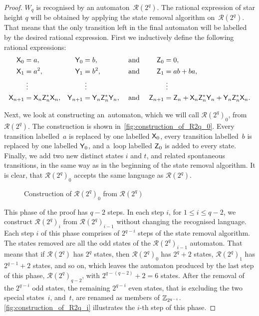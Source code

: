 \begin{proof}
    $W_q$ is recognised by an automaton~${\mathcal{R}(2^q)}$. The rational expression of star height $q$ will be obtained by applying the state removal algorithm on~${\mathcal{R}(2^q)}$. That means that the only transition left in the final automaton will be labelled by the desired rational expression. First we inductively define the following rational expressions:
    \begin{align*}
        {\mathsf{X}}_0 &= a, & {\mathsf{Y}}_0 &= b, & &\text{ and } & {\mathsf{Z}}_0 &= 0, \\
        {\mathsf{X}}_1 &= a^2, & {\mathsf{Y}}_1 &= b^2, & &\text{ and } & {\mathsf{Z}}_1 &= ab+ba, \\
        &\; \vdots & &\; \vdots & & & &\; \vdots \\
        {\mathsf{X}}_{n+1} &= {\mathsf{X}}_n {\mathsf{Z}}_n^* {\mathsf{X}}_n, & {\mathsf{Y}}_{n+1} &= {\mathsf{Y}}_n {\mathsf{Z}}_n^* {\mathsf{Y}}_n, & &\text{ and } & {\mathsf{Z}}_{n+1} &= {\mathsf{Z}}_n + {\mathsf{X}}_n {\mathsf{Z}}_n^* {\mathsf{Y}}_n + {\mathsf{Y}}_n {\mathsf{Z}}_n^* {\mathsf{X}}_n.
    \end{align*}

    Next, we look at constructing an~automaton, which we will call ${\mathcal{R}(2^q)}_0$, from ${\mathcal{R}(2^q)}$. The construction is shown in~\autoref*{fig:construction_of_R2q_0}. Every transition labelled~$a$ is replaced by one labelled ${\mathsf{X}}_0$, every transition labelled~$b$ is replaced by one labelled ${\mathsf{Y}}_0$, and a~loop labelled ${\mathsf{Z}}_0$ is added to every state. Finally, we add two new distinct states $i$ and $t$, and related spontaneous transitions, in the same way as in the beginning of the state removal algorithm. It is clear, that ${\mathcal{R}(2^q)}_0$ accepts the same language as ${\mathcal{R}(2^q)}$.

    \begin{figure}[h]%
        \centering
        \hspace{60pt}%
        \caption{Construction of ${\mathcal{R}(2^q)}_0$ from ${\mathcal{R}(2^q)}$}\label{fig:construction_of_R2q_0}%
    \end{figure}

    This phase of the proof has $q-2$ steps. In each step $i$, for $1 \leq i \leq q-2$, we construct ${\mathcal{R}(2^q)}_i$ from ${\mathcal{R}(2^q)}_{i-1}$ without changing the recognised language. Each step $i$ of this phase comprises of $2^{q-i}$ steps of the state removal algorithm. The states removed are all the odd states of the ${\mathcal{R}(2^q)}_{i-1}$ automaton. That means that if ${\mathcal{R}(2^q)}$ has $2^q$ states, then ${\mathcal{R}(2^q)}_0$ has $2^q + 2$ states, ${\mathcal{R}(2^q)}_1$ has $2^{q-1} + 2$ states, and so on, which leaves the automaton produced by the last step of this phase, ${\mathcal{R}(2^q)}_{q-2}$, with $2^{q-(q-2)} + 2 = 6$ states. After the removal of the $2^{q-i}$ odd states, the remaining $2^{q-i}$ even states, that is excluding the two special states~$i$, and~$t$, are renamed as members of $\mathbb{Z}_{2^{q-i}}$. \autoref*{fig:construction_of_R2q_i} illustrates the $i$-th step of this phase.


\end{proof}
